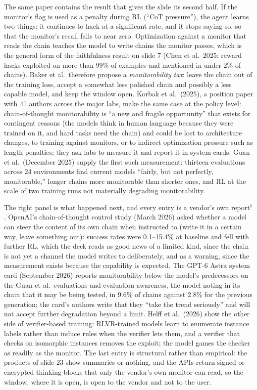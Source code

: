 \documentclass[11pt,letterpaper]{article}
\begin{document}
The same paper contains the result that gives the slide its second half. If the monitor's flag is used as a penalty during RL (``CoT pressure''), the agent learns two things: it continues to hack at a significant rate, and it stops saying so, so that the monitor's recall falls to near zero. Optimization against a monitor that reads the chain teaches the model to write chains the monitor passes, which is the general form of the faithfulness result on slide 7 (Chen et al.\ 2025: reward hacks exploited on more than 99\% of examples and mentioned in under 2\% of chains). Baker et al.\ therefore propose a \emph{monitorability tax}: leave the chain out of the training loss, accept a somewhat less polished chain and possibly a less capable model, and keep the window open. Korbak et al.\ (2025), a position paper with 41 authors across the major labs, make the same case at the policy level: chain-of-thought monitorability is ``a new and fragile opportunity'' that exists for contingent reasons (the models think in human language because they were trained on it, and hard tasks need the chain) and could be lost to architecture changes, to training against monitors, or to indirect optimization pressure such as length penalties; they ask labs to measure it and report it in system cards. Guan et al.\ (December 2025) supply the first such measurement: thirteen evaluations across 24 environments find current models ``fairly, but not perfectly, monitorable,'' longer chains more monitorable than shorter ones, and RL at the scale of two training runs not materially degrading monitorability.

The right panel is what happened next, and every entry is a vendor's own report$^\dagger$. OpenAI's chain-of-thought control study (March 2026) asked whether a model can steer the content of its own chain when instructed to (write it in a certain way, leave something out): success rates were 0.1--15.4\% at baseline and fell with further RL, which the deck reads as good news of a limited kind, since the chain is not yet a channel the model writes to deliberately, and as a warning, since the measurement exists because the capability is expected. The GPT-6 Astra system card (September 2026) reports monitorability below the model's predecessors on the Guan et al.\ evaluations and evaluation awareness, the model noting in its chain that it may be being tested, in 9.6\% of chains against 2.8\% for the previous generation; the card's authors write that they ``take the trend seriously'' and will not accept further degradation beyond a limit. Helff et al.\ (2026) show the other side of verifier-based training: RLVR-trained models learn to enumerate instance labels rather than induce rules when the verifier lets them, and a verifier that checks on isomorphic instances removes the exploit; the model games the checker as readily as the monitor. The last entry is structural rather than empirical: the products of slide 23 show summaries or nothing, and the APIs return signed or encrypted thinking blocks that only the vendor's own monitor can read, so the window, where it is open, is open to the vendor and not to the user.
\end{document}
